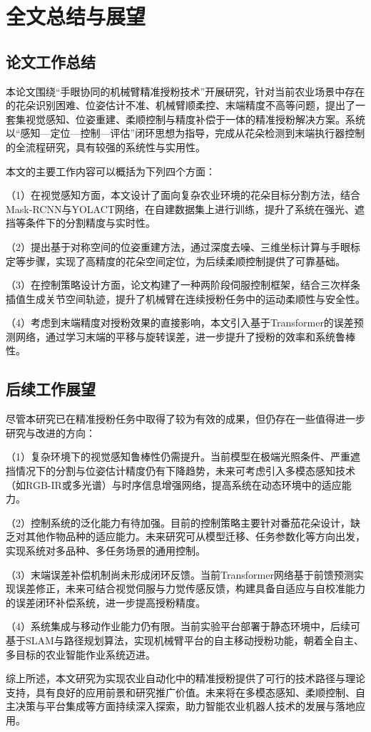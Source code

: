 
\chapter{全文总结与展望}\label{ch:7}

\section{论文工作总结}
本论文围绕“手眼协同的机械臂精准授粉技术”开展研究，针对当前农业场景中存在的花朵识别困难、位姿估计不准、机械臂顺柔控、末端精度不高等问题，提出了一套集视觉感知、位姿重建、柔顺控制与精度补偿于一体的精准授粉解决方案。系统以“感知—定位—控制—评估”闭环思想为指导，完成从花朵检测到末端执行器控制的全流程研究，具有较强的系统性与实用性。

本文的主要工作内容可以概括为下列四个方面：

（1）在视觉感知方面，本文设计了面向复杂农业环境的花朵目标分割方法，结合Mask-RCNN与YOLACT网络，在自建数据集上进行训练，提升了系统在强光、遮挡等条件下的分割精度与实时性。

（2）提出基于对称空间的位姿重建方法，通过深度去噪、三维坐标计算与手眼标定等步骤，实现了高精度的花朵空间定位，为后续柔顺控制提供了可靠基础。

（3）在控制策略设计方面，论文构建了一种两阶段伺服控制框架，结合三次样条插值生成关节空间轨迹，提升了机械臂在连续授粉任务中的运动柔顺性与安全性。

（4）考虑到末端精度对授粉效果的直接影响，本文引入基于Transformer的误差预测网络，通过学习末端的平移与旋转误差，进一步提升了授粉的效率和系统鲁棒性。
\section{后续工作展望}
尽管本研究已在精准授粉任务中取得了较为有效的成果，但仍存在一些值得进一步研究与改进的方向：

（1）复杂环境下的视觉感知鲁棒性仍需提升。当前模型在极端光照条件、严重遮挡情况下的分割与位姿估计精度仍有下降趋势，未来可考虑引入多模态感知技术（如RGB-IR或多光谱）与时序信息增强网络，提高系统在动态环境中的适应能力。

（2）控制系统的泛化能力有待加强。目前的控制策略主要针对番茄花朵设计，缺乏对其他作物品种的适应能力。未来研究可从模型迁移、任务参数化等方向出发，实现系统对多品种、多任务场景的通用控制。

（3）末端误差补偿机制尚未形成闭环反馈。当前Transformer网络基于前馈预测实现误差修正，未来可结合视觉伺服与力觉传感反馈，构建具备自适应与自校准能力的误差闭环补偿系统，进一步提高授粉精度。

（4）系统集成与移动作业能力仍有限。当前实验平台部署于静态环境中，后续可基于SLAM与路径规划算法，实现机械臂平台的自主移动授粉功能，朝着全自主、多目标的农业智能作业系统迈进。

综上所述，本文研究为实现农业自动化中的精准授粉提供了可行的技术路径与理论支持，具有良好的应用前景和研究推广价值。未来将在多模态感知、柔顺控制、自主决策与平台集成等方面持续深入探索，助力智能农业机器人技术的发展与落地应用。